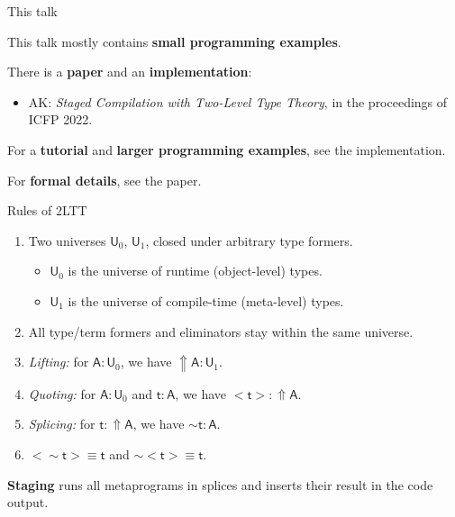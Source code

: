 \documentclass[dvipsnames,aspectratio=169]{beamer}
\newcommand{\msf}[1]{\mathsf{#1}}
\newcommand{\Lift}{{\Uparrow}}
\newcommand{\spl}{{\sim}}
\newcommand{\qut}[1]{{<}#1{>}}
\newcommand{\U}{\msf{U}}
\theoremstyle{remark}
\newcommand{\msA}{\msf{A}}
\newcommand{\mst}{\msf{t}}
\begin{document}
\begin{frame}{This talk}

This talk mostly contains \textbf{small programming examples}.
\vspace{1em}
\pause

There is a \textbf{paper} and an \textbf{implementation}:
\begin{itemize}
  \item AK: \emph{Staged Compilation with Two-Level Type Theory}, in the proceedings of ICFP 2022.
\end{itemize}
\vspace{1em}
\pause

For a \textbf{tutorial} and \textbf{larger programming examples}, see the implementation.
\vspace{1em}
\pause

For \textbf{formal details}, see the paper.

\end{frame}

\begin{frame}{Rules of 2LTT}

  \begin{enumerate}
    \item Two universes $\U_0$, $\U_1$, closed under arbitrary type formers.
      \begin{itemize}
        \item $\U_0$ is the universe of runtime (object-level) types.
        \item $\U_1$ is the universe of compile-time (meta-level) types.
      \end{itemize}
    \pause
    \item All type/term formers and eliminators stay within the same universe.
    \pause
    \item \emph{Lifting:} for $\msA : \U_0$, we have $\Lift \msA : \U_1$.
    \pause
    \item \emph{Quoting:} for $\msA : \U_0$ and $\mst : \msA$, we have $\qut{\mst} : \Lift \msA$.
    \pause
    \item \emph{Splicing:} for $\mst : \Lift \msA$, we have $\spl{\mst} : \msA$.
    \pause
    \item $\qut{\spl{\mst}} \equiv \mst$ and $\spl{\qut{\mst}} \equiv \mst$.
  \end{enumerate}
\vspace{1em}
\pause

\begin{block}{}
\textbf{Staging} runs all metaprograms in splices and inserts their result
in the code output.
\end{block}

\end{frame}
\end{document}
